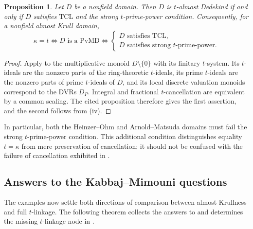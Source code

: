 \documentclass[11pt]{amsart}
\newtheorem{proposition}[proposition]{Proposition}
\theoremstyle{definition}
\theoremstyle{remark}
\newcommand{\PvMD}{\mathrm{PvMD}}
\newcommand{\TCL}{\mathrm{TCL}}
\begin{document}
\begin{proposition}\label{prop:prime-power}
Let $D$ be a nonfield domain.  Then $D$ is $t$-almost Dedekind if and only if
$D$ satisfies $\TCL$ and the strong $t$-prime-power condition.  Consequently,
for a nonfield almost Krull domain,
\begin{equation}\label{eq:prime-power-chain}
 \kappa=t
 \iff D\text{ is a }\PvMD
 \iff
 \left\{
 \begin{array}{l}
 D\text{ satisfies }\TCL,\\
 D\text{ satisfies strong }t\text{-prime-power}.
 \end{array}
 \right.
\end{equation}
\end{proposition}

\begin{proof}
Apply \cite[Proposition~3.6]{OlberdingReinhart} to the multiplicative
monoid $D\setminus\{0\}$ with its finitary $t$-system.  Its $t$-ideals are
the nonzero parts of the ring-theoretic $t$-ideals, its prime $t$-ideals are
the nonzero parts of prime $t$-ideals of $D$, and its local discrete
valuation monoids correspond to the DVRs $D_P$.  Integral and fractional
$t$-cancellation are equivalent by a common scaling.  The cited proposition
therefore gives the first assertion, and the second follows from
(iv).
\end{proof}

In particular, both the Heinzer--Ohm and Arnold--Matsuda domains must fail
the strong $t$-prime-power condition.  This additional condition
distinguishes equality $t=\kappa$ from mere preservation of cancellation;
it should not be confused with the failure of cancellation exhibited in
.

\subsection{Answers to the Kabbaj--Mimouni questions}

The examples now settle both directions of comparison between almost
Krullness and full $t$-linkage.  The following theorem collects the answers
to  and determines the missing $t$-linkage node in
\cite[Figure~1]{KabbajMimouniStar}.
\end{document}
